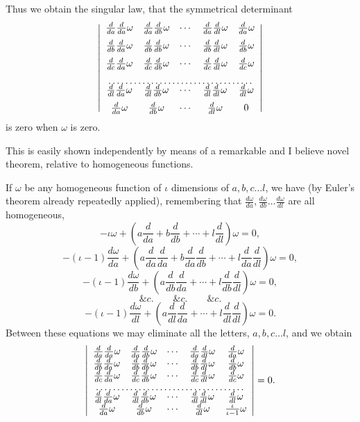 \documentclass[11pt]{article}
\newcommand{\sourcepage}[1]{\marginpar{\scriptsize p.~#1}}
\begin{document}
{{\sourcepage{173}
Thus we obtain the singular law, that the symmetrical determinant
\[
\left|
\begin{array}{ccccc}
\frac{d}{da}\frac{d}{da}\omega&\frac{d}{da}\frac{d}{db}\omega&\cdots&\frac{d}{da}\frac{d}{dl}\omega&\frac{d}{da}\omega\\[0.6em]
\frac{d}{db}\frac{d}{da}\omega&\frac{d}{db}\frac{d}{db}\omega&\cdots&\frac{d}{db}\frac{d}{dl}\omega&\frac{d}{db}\omega\\[0.6em]
\frac{d}{dc}\frac{d}{da}\omega&\frac{d}{dc}\frac{d}{db}\omega&\cdots&\frac{d}{dc}\frac{d}{dl}\omega&\frac{d}{dc}\omega\\[0.6em]
\multicolumn{5}{c}{\dotfill}\\[-0.3em]
\frac{d}{dl}\frac{d}{da}\omega&\frac{d}{dl}\frac{d}{db}\omega&\cdots&\frac{d}{dl}\frac{d}{dl}\omega&\frac{d}{dl}\omega\\[0.6em]
\frac{d}{da}\omega&\frac{d}{db}\omega&\cdots&\frac{d}{dl}\omega&0
\end{array}
\right|
\]
is zero when $\omega$ is zero.

This is easily shown independently by means of a remarkable and I believe novel theorem, relative to homogeneous functions.

If $\omega$ be any homogeneous function of $\iota$ dimensions of $a,b,c\ldots l$, we have (by Euler's theorem already repeatedly applied), remembering that $\frac{d\omega}{da},\frac{d\omega}{db}\ldots\frac{d\omega}{dl}$ are all homogeneous,
\[
 -\iota\omega+\left(a\frac{d}{da}+b\frac{d}{db}+\cdots+l\frac{d}{dl}\right)\omega=0,
\]
\[
 -(\iota-1)\frac{d\omega}{da}+\left(a\frac{d}{da}\frac{d}{da}+b\frac{d}{da}\frac{d}{db}+\cdots+l\frac{d}{da}\frac{d}{dl}\right)\omega=0,
\]
\[
 -(\iota-1)\frac{d\omega}{db}+\left(a\frac{d}{db}\frac{d}{da}+\cdots+l\frac{d}{db}\frac{d}{dl}\right)\omega=0,
\]
\[
 \&c.\qquad\&c.\qquad\&c.
\]
\[
 -(\iota-1)\frac{d\omega}{dl}+\left(a\frac{d}{dl}\frac{d}{da}+\cdots+l\frac{d}{dl}\frac{d}{dl}\right)\omega=0.
\]
Between these equations we may eliminate all the letters, $a,b,c\ldots l$, and we obtain
\[
\left|
\begin{array}{ccccc}
\frac{d}{da}\frac{d}{da}\omega&\frac{d}{da}\frac{d}{db}\omega&\cdots&\frac{d}{da}\frac{d}{dl}\omega&\frac{d}{da}\omega\\
\frac{d}{db}\frac{d}{da}\omega&\frac{d}{db}\frac{d}{db}\omega&\cdots&\frac{d}{db}\frac{d}{dl}\omega&\frac{d}{db}\omega\\
\frac{d}{dc}\frac{d}{da}\omega&\frac{d}{dc}\frac{d}{db}\omega&\cdots&\frac{d}{dc}\frac{d}{dl}\omega&\frac{d}{dc}\omega\\
\multicolumn{5}{c}{\dotfill}\\[-0.3em]
\frac{d}{dl}\frac{d}{da}\omega&\frac{d}{dl}\frac{d}{db}\omega&\cdots&\frac{d}{dl}\frac{d}{dl}\omega&\frac{d}{dl}\omega\\
\frac{d}{da}\omega&\frac{d}{db}\omega&\cdots&\frac{d}{dl}\omega&\frac{\iota}{\iota-1}\omega
\end{array}
\right|=0.
\]

}}
\end{document}
